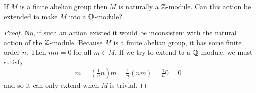 \documentclass[num=2,duedate=02-10-21,course=Algebra\ II,proflastname=Walton]{hwtemplate}
\begin{document}
\problem[5]
\begin{claim}
	If \(M\) is a finite abelian group then \(M\) is naturally a \(\mathbb{Z}\)-module. Can this action be extended to make \(M\) into a \(\mathbb{Q}\)-module?
\end{claim}
\begin{proof}
	No, if such an action existed it would be inconsistent with the natural action of the \(\mathbb{Z}\)-module. Because \(M\) is a finite abelian group, it has some finite order \(n\). Then \(nm = 0\) for all \(m \in M\). If we try to extend to a \(\mathbb{Q}\)-module, we must satisfy
	\begin{align*}
		m = (\frac{1}{n}n)m= \frac{1}{n} (nm) = \frac{1}{n} 0 = 0
	\end{align*}
	and so it can only extend when \(M\) is trivial.
\end{proof}
\end{document}
